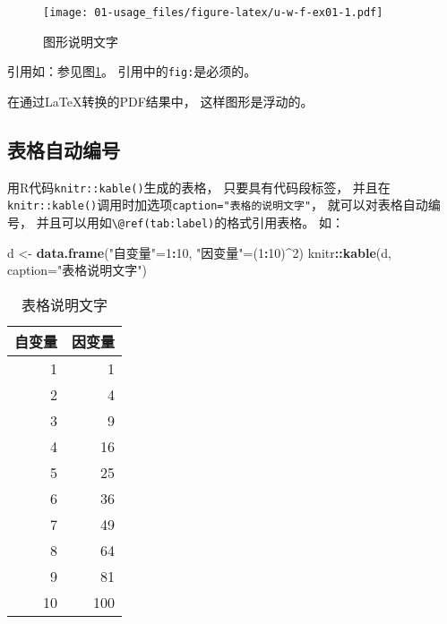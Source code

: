 \documentclass[]{book}
\newenvironment{Shaded}{\begin{snugshade}}{\end{snugshade}}
\newcommand{\DataTypeTok}[1]{\textcolor[rgb]{0.13,0.29,0.53}{#1}}
\newcommand{\DecValTok}[1]{\textcolor[rgb]{0.00,0.00,0.81}{#1}}
\newcommand{\KeywordTok}[1]{\textcolor[rgb]{0.13,0.29,0.53}{\textbf{#1}}}
\newcommand{\NormalTok}[1]{#1}
\newcommand{\OperatorTok}[1]{\textcolor[rgb]{0.81,0.36,0.00}{\textbf{#1}}}
\newcommand{\StringTok}[1]{\textcolor[rgb]{0.31,0.60,0.02}{#1}}
\theoremstyle{definition}
\theoremstyle{definition}
\theoremstyle{definition}
\theoremstyle{remark}
\begin{document}
\begin{figure}
\centering
\texttt{[image: 01-usage\_files/figure-latex/u-w-f-ex01-1.pdf]}
\caption{\label{fig:u-w-f-ex01}图形说明文字}
\end{figure}

引用如：参见图\ref{fig:u-w-f-ex01}。 引用中的\texttt{fig:}是必须的。

在通过LaTeX转换的PDF结果中， 这样图形是浮动的。

\hypertarget{usage-writing-tab}{%
\subsection{表格自动编号}\label{usage-writing-tab}}

用R代码\texttt{knitr::kable()}生成的表格， 只要具有代码段标签，
并且在\texttt{knitr::kable()}调用时加选项\texttt{caption="表格的说明文字"}，
就可以对表格自动编号，
并且可以用如\texttt{\textbackslash{}@ref(tab:label)}的格式引用表格。
如：

\begin{Shaded}
\begin{Highlighting}[]
\NormalTok{d <-}\StringTok{ }\KeywordTok{data.frame}\NormalTok{(}\StringTok{"自变量"}\NormalTok{=}\DecValTok{1}\OperatorTok{:}\DecValTok{10}\NormalTok{, }\StringTok{"因变量"}\NormalTok{=(}\DecValTok{1}\OperatorTok{:}\DecValTok{10}\NormalTok{)}\OperatorTok{^}\DecValTok{2}\NormalTok{)}
\NormalTok{knitr}\OperatorTok{::}\KeywordTok{kable}\NormalTok{(d, }\DataTypeTok{caption=}\StringTok{"表格说明文字"}\NormalTok{)}
\end{Highlighting}
\end{Shaded}

\begin{table}[t]

\caption{\label{tab:u-w-tab-ex01}表格说明文字}
\centering
\begin{tabular}{r|r}
\hline
自变量 & 因变量\\
\hline
1 & 1\\
\hline
2 & 4\\
\hline
3 & 9\\
\hline
4 & 16\\
\hline
5 & 25\\
\hline
6 & 36\\
\hline
7 & 49\\
\hline
8 & 64\\
\hline
9 & 81\\
\hline
10 & 100\\
\hline
\end{tabular}
\end{table}
\end{document}
